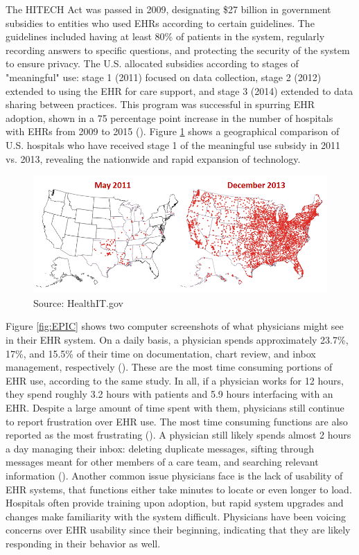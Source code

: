 \documentclass[12pt]{article}
\begin{document}
The HITECH Act was passed in 2009, designating \$27 billion in government subsidies to entities who used EHRs according to certain guidelines. The guidelines included having at least 80\% of patients in the system, regularly recording answers to specific questions, and protecting the security of the system to ensure privacy. The U.S. allocated subsidies according to stages of "meaningful" use: stage 1 (2011) focused on data collection, stage 2 (2012) extended to using the EHR for care support, and stage 3 (2014) extended to data sharing between practices. This program was successful in  spurring EHR adoption, shown in a 75 percentage point increase in the number of hospitals with EHRs from 2009 to 2015 (\cite{stats}). Figure \ref{fig:meanuse} shows a geographical comparison of U.S. hospitals who have received stage 1 of the meaningful use subsidy in 2011 vs. 2013, revealing the nationwide and rapid expansion of technology. 

\begin{figure}[ht]
    \centering
    \captionsetup{width=.6\linewidth}
    \caption{Hospitals Receiving Meaningful Use Stage 1 Subsidy}
    \includegraphics[scale=.6]{graphics/QS-Hospitals-Receiving-Payments-for-MU-and-Adoption.png}
    \caption*{Source: HealthIT.gov}
    \label{fig:meanuse}
\end{figure}

Figure \ref{fig:EPIC} shows two computer screenshots of what physicians might see in their EHR system. On a daily basis, a physician spends approximately 23.7\%, 17\%, and 15.5\% of their time on documentation, chart review, and inbox management, respectively (\cite{arndt2017tethered}). These are the most time consuming portions of EHR use, according to the same study. In all, if a physician works for 12 hours, they spend roughly 3.2 hours with patients and 5.9 hours interfacing with an EHR. Despite a large amount of time spent with them, physicians still continue to report frustration over EHR use. The most time consuming functions are also reported as the most frustrating (\cite{dymek2021building}). A physician still likely spends almost 2 hours a day managing their inbox: deleting duplicate messages, sifting through messages meant for other members of a care team, and searching relevant information (\cite{dymek2021building}). Another common issue physicians face is the lack of usability of EHR systems, that functions either take minutes to locate or even longer to load. Hospitals often provide training upon adoption, but rapid system upgrades and changes make familiarity with the system difficult. Physicians have been voicing concerns over EHR usability since their beginning, indicating that they are likely responding in their behavior as well.
\end{document}
